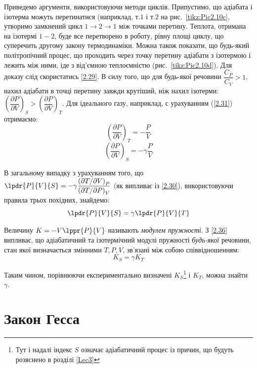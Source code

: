 Приведемо аргументи, використовуючи методи циклів. Припустимо, що адіабата і ізотерма можуть
перетинатися (наприклад, т.$1$ і т.$2$ на рис.~\ref{tikz:Pic2.10c}, утворимо замкнений цикл $1 \to 2
\to
1$ між точками перетину.
Теплота, отримана на ізотермі $1 - 2$, буде все перетворено в роботу, рівну площі циклу, що
суперечить другому закону термодинаміки. Можна також показати, що будь-який
політропічний процес, що проходить через точку перетину адіабати з ізотермою і лежить між
ними, іде з від'ємною теплоємністю (рис.~\ref{tikz:Pic2.10d}). Для доказу слід скористатись
\eqref{2.29}. В силу того,
що для будь-якої речовини $\dfrac{C_P}{C_V}>1$, нахил адіабати в точці перетину завжди
крутіший, ніж нахил ізотерми: $\left(\dfrac{\partial P}{\partial
		V}\right)_S>\left(\dfrac{\partial P}{\partial V}\right)_T$. Для ідеального газу, наприклад, с
урахуванням (\ref{2.31}) отримаємо:
\begin{equation}\label{2.34}
	\left(\dfrac{\partial P}{\partial V}\right)_T = -\dfrac{P}{V}
\end{equation}
\begin{equation}\label{2.35}
	\left(\dfrac{\partial P}{\partial V}\right)_S = -\gamma\dfrac{P}{V}
\end{equation}

В загальному випадку з урахуванням того, що $\lpdr{P}{V}{S} = -\gamma \dfrac{\left(\partial T /
\partial
V\right)_P}{\left(\partial T / \partial P\right)_V}$ (як випливає із \eqref{2.30}), використовуючи
правила трьох похідних, знайдемо:
\begin{equation}\label{2.36}
	\lpdr{P}{V}{S} = \gamma\lpdr{P}{V}{T}
\end{equation}

Величину $K = -V\lppr{P}{V}$ називають \emph{модулем пружності}. З \eqref{2.36} випливає, що
адіабатичний та ізотермічний модулі пружності \emph{будь-якої} речовини, стан якої
визначається змінними $T,P,V$, зв'язані між собою співвідношенням:
\begin{equation}\label{2.37}
	K_S = \gamma K_T
\end{equation}

Таким чином, порівнюючи експериментально визначені $K_S$\footnote{Тут і надалі індекс $S$ означає
адіабатичний процес із причин, що будуть розяснено в розділі \ref{Lec3}} і $K_T$, можна знайти
$\gamma$.

\section{Закон Гесса}


